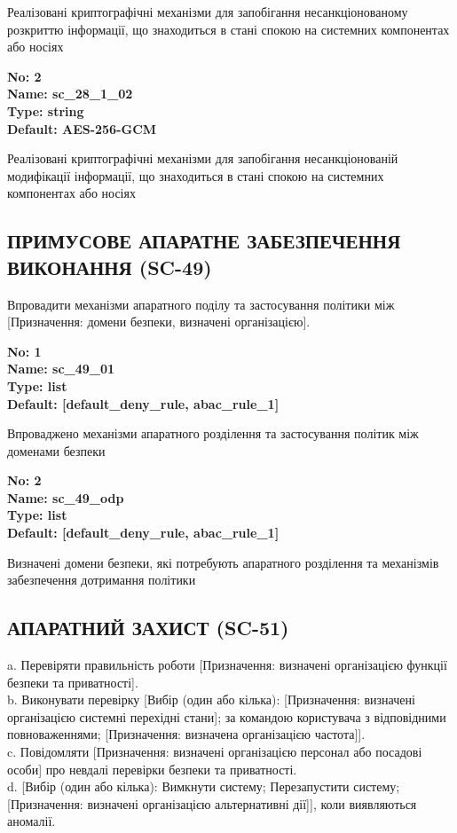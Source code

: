 \documentclass{article}
\begin{document}
{\footnotesize Реалізовані криптографічні механізми для запобігання несанкціонованому розкриттю інформації, що знаходиться в стані спокою на системних компонентах або носіях}


{\footnotesize\bfseries
No: 2\\
Name: sc\_\allowbreak{}28\_\allowbreak{}1\_\allowbreak{}02\\
Type: string\\
Default: \textquotedbl{}AES-256-GCM\textquotedbl{}
}

{\footnotesize Реалізовані криптографічні механізми для запобігання несанкціонованій модифікації інформації, що знаходиться в стані спокою на системних компонентах або носіях}




\subsection{ПРИМУСОВЕ АПАРАТНЕ ЗАБЕЗПЕЧЕННЯ ВИКОНАННЯ (SC-49)}
Впровадити механізми апаратного поділу та застосування політики між [Призначення: домени безпеки, визначені організацією].

\vspace{10pt}
{\footnotesize\bfseries
No: 1\\
Name: sc\_\allowbreak{}49\_\allowbreak{}01\\
Type: list\\
Default: [\textquotedbl{}default\_\allowbreak{}deny\_\allowbreak{}rule\textquotedbl{}, \textquotedbl{}abac\_\allowbreak{}rule\_\allowbreak{}1\textquotedbl{}]
}

{\footnotesize Впроваджено механізми апаратного розділення та застосування політик між доменами безпеки}


{\footnotesize\bfseries
No: 2\\
Name: sc\_\allowbreak{}49\_\allowbreak{}odp\\
Type: list\\
Default: [\textquotedbl{}default\_\allowbreak{}deny\_\allowbreak{}rule\textquotedbl{}, \textquotedbl{}abac\_\allowbreak{}rule\_\allowbreak{}1\textquotedbl{}]
}

{\footnotesize Визначені домени безпеки, які потребують апаратного розділення та механізмів забезпечення дотримання політики}




\subsection{АПАРАТНИЙ ЗАХИСТ (SC-51)}
a. Перевіряти правильність роботи [Призначення: визначені організацією функції безпеки та приватності].\\ 
b. Виконувати перевірку [Вибір (один або кілька): [Призначення: визначені організацією системні перехідні стани]; за командою користувача з відповідними повноваженнями; [Призначення: визначена організацією частота]].\\ 
c. Повідомляти [Призначення: визначені організацією персонал або посадові особи] про невдалі перевірки безпеки та приватності.\\ 
d. [Вибір (один або кілька): Вимкнути систему; Перезапустити систему; [Призначення: визначені організацією альтернативні дії]], коли виявляються аномалії.
\end{document}
